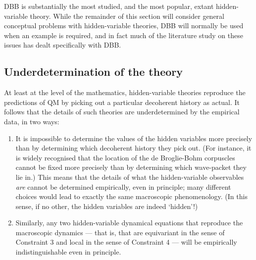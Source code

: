 \documentclass[12pt]{article}
\begin{document}
DBB is substantially the most studied, and the most popular, extant hidden-variable theory. While the remainder of this section will consider general conceptual problems with hidden-variable theories, DBB will normally be used when an example is required, and in fact much of the literature study on these issues has dealt specifically with DBB.

\subsection{Underdetermination of the theory}

At least at the level of the mathematics, hidden-variable theories reproduce the predictions of QM by picking out a particular decoherent history as actual. It follows that the details of such theories are underdetermined by the empirical data, in two ways:
\begin{enumerate}
\item It is impossible to determine the values of the hidden variables more precisely than by determining which decoherent history they pick out. (For instance, it is widely recognised that the location of the de Broglie-Bohm corpuscles cannot be fixed more precisely than by determining which wave-packet they lie in.) This means that the details of what the hidden-variable observables \emph{are} cannot be determined empirically, even in principle; many different choices would lead to exactly the same macroscopic phenomenology. (In this sense, if no other, the hidden variables are indeed `hidden'!)
\item Similarly, any two hidden-variable dynamical equations that reproduce the macroscopic dynamics --- that is, that are equivariant in the sense of Constraint 3 and local in the sense of Constraint 4 --- will be empirically indistinguishable even in principle.  
\end{enumerate}
\end{document}
